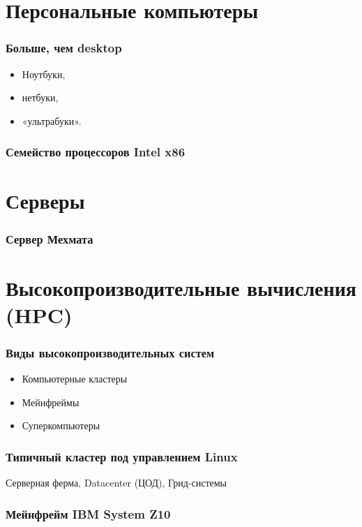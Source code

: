 \section {Персональные компьютеры}

\begin{frame}
\frametitle{Больше, чем desktop}
\begin{itemize}
    \item Ноутбуки,
    \item нетбуки,
    \item «ультрабуки».
\end{itemize}
\end{frame}

\begin{frame}
\frametitle{Семейство процессоров Intel x86}
\end{frame}

\section {Серверы}

\begin{frame}
\frametitle{Сервер Мехмата}
\end{frame}

\section {Высокопроизводительные вычисления (HPC)}

\begin{frame}
\frametitle{Виды высокопроизводительных систем}
\begin{itemize}
    \item Компьютерные кластеры
    \item Мейнфреймы
    \item Суперкомпьютеры
\end{itemize}
\end{frame}

\begin{frame}
\frametitle{Типичный кластер под управлением Linux}
\pause Серверная ферма, Datacenter (ЦОД), Грид-системы
\end{frame}

\begin{frame}
\frametitle{Мейнфрейм IBM System Z10}
\end{frame}


